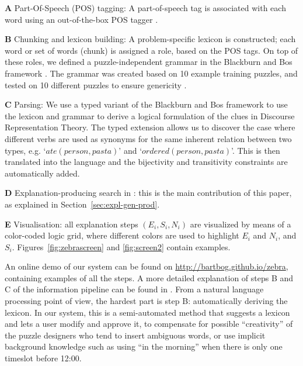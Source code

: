 \begin{compactenum}
	\item[\bf A] Part-Of-Speech (POS) tagging: A part-of-speech tag is associated with each word using an out-of-the-box POS tagger \cite{DBLP:journals/coling/MarcusSM94}.
	\item[\bf B] Chunking and lexicon building: A problem-specific lexicon is constructed; each word or set of words (chunk) is assigned a role, based on the POS tags. On top of these roles, we defined a puzzle-independent grammar in the Blackburn and Bos framework \cite{Blackburn2005,Blackburn2006}. The grammar was created based on 10 example training puzzles, and tested on 10 different puzzles to ensure genericity \cite{msc/Claes17}. 
	\item[\bf C] Parsing: We use a typed variant of the Blackburn and Bos framework to use the lexicon and grammar to derive a logical formulation of the clues in Discourse Representation Theory. The typed extension allows us to discover the case where different verbs are used as synonyms for the same inherent relation between two types, e.g. `$ate(person, pasta)$' and `$ordered(person, pasta)$'. This is then translated into the \idp language and the bijectivity and transitivity constraints are automatically added. 
	\item[\bf D] Explanation-producing search in \idp: this is the main contribution of this paper, as explained in Section~\ref{sec:expl-gen-prod}.
	\item[\bf E] Visualisation: all  explanation steps $(E_i, S_i, N_i)$ are visualized by means of a color-coded logic grid, where different colors are used to highlight $E_i$ and $N_i$, and $S_i$. Figures~\ref{fig:zebrascreen} and \ref{fig:screen2} contain examples.
\end{compactenum}

\noindent
 An online demo of our system can be found on \url{http://bartbog.github.io/zebra}, containing examples of all the steps. 
% 
A more detailed explanation of steps B and C of the information pipeline can be found in \cite{msc/Claes17}. From a natural language processing point of view, the hardest part is step B: automatically deriving the lexicon. In our system, this is a semi-automated method that suggests a lexicon and lets a user modify and approve it, to compensate for possible ``creativity'' of the puzzle designers who tend to insert ambiguous words, or use implicit background knowledge such as using ``in the morning'' when there is only one timeslot before 12:00.
